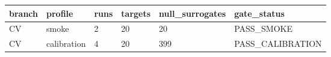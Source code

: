 \begin{tabular}{llllll}
\toprule
branch & profile & runs & targets & null\_surrogates & gate\_status \\
\midrule
CV & smoke & 2 & 20 & 20 & PASS\_SMOKE \\
CV & calibration & 4 & 20 & 399 & PASS\_CALIBRATION \\
\bottomrule
\end{tabular}
